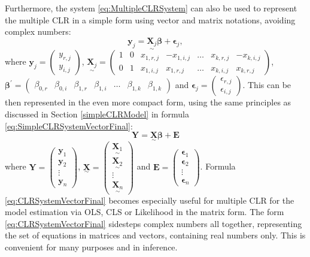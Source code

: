 \documentclass[
]{book}
\begin{document}
Furthermore, the system \eqref{eq:MultipleCLRSystem} can also be used to represent the multiple CLR in a simple form using vector and matrix notations, avoiding complex numbers:
\begin{equation}
    \mathbf{y}_j = \underset{\sim}{\mathbf{X}_j} \boldsymbol{\beta} + \boldsymbol{\epsilon}_j ,
    \label{eq:MultipleCLRSystemVector}
\end{equation}
where \(\mathbf{y}_j = \begin{pmatrix} y_{r,j} \\ y_{i,j} \end{pmatrix}\), \(\underset{\sim}{\mathbf{X}_j} = \begin{pmatrix} 1 & 0 & x_{1,r,j} & -x_{1,i,j} & \dots & x_{k,r,j} & -x_{k,i,j} \\ 0 & 1 & x_{1,i,j} & x_{1,r,j} & \dots & x_{k,i,j} & x_{k,r,j} \end{pmatrix}\), \(\boldsymbol{\beta}^\prime = \begin{pmatrix} \beta_{0,r} & \beta_{0,i} & \beta_{1,r} & \beta_{1,i} & \dots & \beta_{1,k} & \beta_{1,k} \end{pmatrix}\) and \(\mathbf{\epsilon}_j = \begin{pmatrix} \epsilon_{r,j} \\ \epsilon_{i,j} \end{pmatrix}\). This can be then represented in the even more compact form, using the same principles as discussed in Section \ref{simpleCLRModel} in formula \eqref{eq:SimpleCLRSystemVectorFinal}:
\begin{equation}
    \mathbf{Y} = \underset{\sim}{\mathbf{X}} \boldsymbol{\beta} + \mathbf{E} 
    \label{eq:CLRSystemVectorFinal}
\end{equation}
where \(\mathbf{Y}=\begin{pmatrix}\mathbf{y}_1 \\ \mathbf{y}_2\\ \vdots \\ \mathbf{y}_n \end{pmatrix}\), \(\underset{\sim}{\mathbf{X}}=\begin{pmatrix} \underset{\sim}{\mathbf{X}_1} \\ \underset{\sim}{\mathbf{X}_2} \\ \vdots \\ \underset{\sim}{\mathbf{X}_n} \end{pmatrix}\) and \(\mathbf{E}=\begin{pmatrix}\boldsymbol{\epsilon}_1 \\ \boldsymbol{\epsilon}_2\\ \vdots \\ \boldsymbol{\epsilon}_n \end{pmatrix}\). Formula \eqref{eq:CLRSystemVectorFinal} becomes especially useful for multiple CLR for the model estimation via OLS, CLS or Likelihood in the matrix form. The form \eqref{eq:CLRSystemVectorFinal} sidesteps complex numbers all together, representing the set of equations in matrices and vectors, containing real numbers only. This is convenient for many purposes and in inference.
\end{document}

